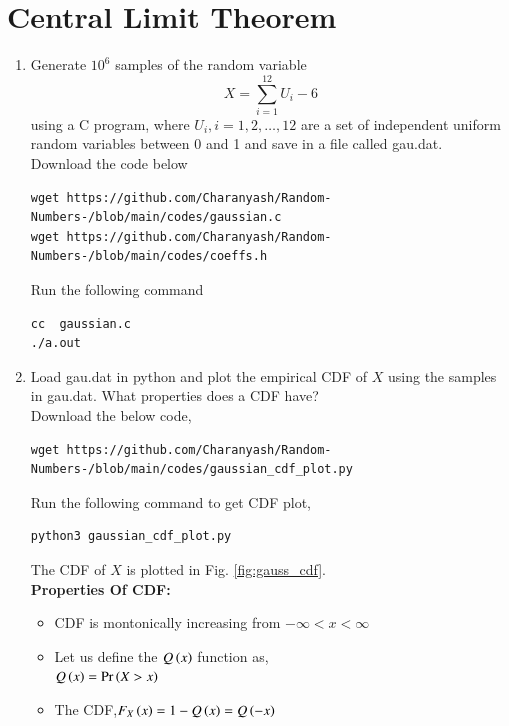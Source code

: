 \documentclass[journal,12pt,twocolumn]{IEEEtran}
\renewcommand\thesection{\arabic{section}}
\begin{document}
\section{Central Limit Theorem}
%
\begin{enumerate}[label=\thesection.\arabic*
,ref=\thesection.\theenumi]

%
\item
Generate $10^6$ samples of the random variable
%
\begin{equation}
X = \sum_{i=1}^{12}U_i -6
\end{equation}
%
using a C program, where $U_i, i = 1,2,\dots, 12$ are  a set of independent uniform random variables between 0 and 1
and save in a file called gau.dat.\\
\solution Download the code below
\begin{lstlisting}
wget https://github.com/Charanyash/Random-Numbers-/blob/main/codes/gaussian.c
wget https://github.com/Charanyash/Random-Numbers-/blob/main/codes/coeffs.h
\end{lstlisting}
Run the following command
\begin{lstlisting}
cc  gaussian.c
./a.out
\end{lstlisting}
%
\item
Load gau.dat in python and plot the empirical CDF of $X$ using the samples in gau.dat. What properties does a CDF have?\\
\solution Download the below code,
\begin{lstlisting}
wget https://github.com/Charanyash/Random-Numbers-/blob/main/codes/gaussian_cdf_plot.py
\end{lstlisting}
Run the following command to get CDF plot,
\begin{lstlisting}
python3 gaussian_cdf_plot.py
\end{lstlisting}
The CDF of $X$ is plotted in Fig. \ref{fig:gauss_cdf}.\\
\textbf{Properties Of CDF:}
 \begin{itemize}
      \item CDF is montonically increasing from $ -\infty < x< \infty$	 
      \item Let us define the $Q\left(x\right)$ function as,\\
	      $ Q\left(x\right) = \Pr\left(X>x\right) $
      \item The CDF,$F_{X}\left(x\right) = 1-Q\left(x\right) =Q\left(-x\right) $ 	      
 \end{itemize}


\end{enumerate}
\end{document}
